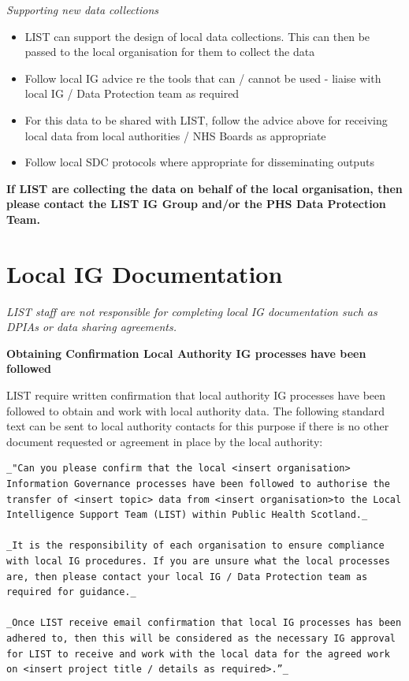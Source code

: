 \documentclass[
]{book}
\begin{document}
\emph{Supporting new data collections}

\begin{itemize}
\item
  LIST can support the design of local data collections. This can then be passed to the local organisation for them to collect the data
\item
  Follow local IG advice re the tools that can / cannot be used - liaise with local IG / Data Protection team as required
\item
  For this data to be shared with LIST, follow the advice above for receiving local data from local authorities / NHS Boards as appropriate
\item
  Follow local SDC protocols where appropriate for disseminating outputs
\end{itemize}

\textbf{If LIST are collecting the data on behalf of the local organisation, then please contact the LIST IG Group and/or the PHS Data Protection Team.}

\hypertarget{local-ig-documentation}{%
\section{Local IG Documentation}\label{local-ig-documentation}}

\emph{LIST staff are not responsible for completing local IG documentation such as DPIAs or data sharing agreements.}

\textbf{Obtaining Confirmation Local Authority IG processes have been followed}

LIST require written confirmation that local authority IG processes have been followed to obtain and work with local authority data. The following standard text can be sent to local authority contacts for this purpose if there is no other document requested or agreement in place by the local authority:

\begin{verbatim}
_"Can you please confirm that the local <insert organisation> Information Governance processes have been followed to authorise the transfer of <insert topic> data from <insert organisation>to the Local Intelligence Support Team (LIST) within Public Health Scotland._

_It is the responsibility of each organisation to ensure compliance with local IG procedures. If you are unsure what the local processes are, then please contact your local IG / Data Protection team as required for guidance._

_Once LIST receive email confirmation that local IG processes has been adhered to, then this will be considered as the necessary IG approval for LIST to receive and work with the local data for the agreed work on <insert project title / details as required>.”_
\end{verbatim}
\end{document}
